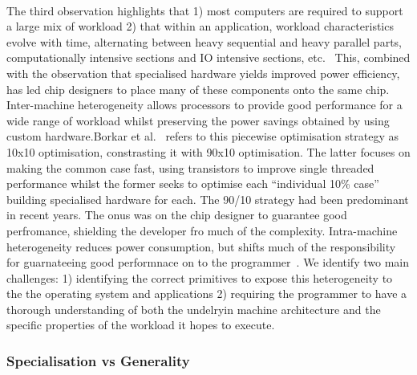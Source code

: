 \paragraph{} The third observation highlights that 1) most computers are 
required to support a large mix of workload 2) that within an application, workload characteristics evolve with time, alternating between heavy sequential and heavy parallel parts, computationally intensive sections and IO intensive sections, etc.~\cite{balakrishnan2005impactperfasym} This, combined with the observation that specialised hardware yields improved power efficiency, has led chip designers to place many of these components onto the same chip. Inter-machine heterogeneity allows processors to provide good performance for a wide range of workload whilst preserving the power savings obtained by using custom hardware.Borkar et al.~\cite{borkar2011future} refers to this piecewise
optimisation strategy as 10x10 optimisation, constrasting it with 90x10 optimisation. The latter focuses on making the common case fast, using transistors to improve single threaded performance whilst the former
seeks to optimise each ``individual 10\% case'' building specialised hardware for each. The 90/10 strategy had been predominant in recent years. The onus was on the chip designer to guarantee good perfromance, shielding the developer fro much of the complexity. Intra-machine heterogeneity reduces power consumption, but shifts much of the responsibility for guarnateeing good performnace on to the programmer~\cite{Schupbach08embracingdiversity}. We identify two main challenges: 1) identifying the correct primitives to expose this heterogeneity to the the operating system and applications 2) requiring the programmer to have a thorough understanding of both the undelryin machine architecture and the specific properties of the workload it hopes to execute.  

\subsubsection{Specialisation vs Generality} 
